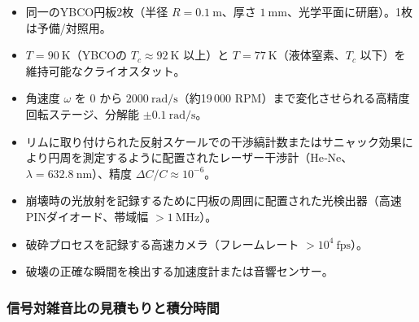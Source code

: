 \documentclass[12pt,a4paper]{article}
\begin{document}
	\begin{itemize}
		\item 同一のYBCO円板2枚（半径 \(R = 0.1\ \text{m}\)、厚さ \(1\ \text{mm}\)、光学平面に研磨）。1枚は予備/対照用。
		\item \(T = 90\ \text{K}\)（YBCOの \(T_c \approx 92\ \text{K}\) 以上）と \(T = 77\ \text{K}\)（液体窒素、\(T_c\) 以下）を維持可能なクライオスタット。
		\item 角速度 \(\omega\) を \(0\) から \(2000\ \text{rad/s}\)（約19 000 RPM）まで変化させられる高精度回転ステージ、分解能 \(\pm 0.1\ \text{rad/s}\)。
		\item リムに取り付けられた反射スケールでの干渉縞計数またはサニャック効果により円周を測定するように配置されたレーザー干渉計（He‑Ne、\(\lambda = 632.8\ \text{nm}\)）、精度 \(\Delta C/C \approx 10^{-6}\)。
		\item 崩壊時の光放射を記録するために円板の周囲に配置された光検出器（高速PINダイオード、帯域幅 \(> 1\ \text{MHz}\)）。
		\item 破砕プロセスを記録する高速カメラ（フレームレート \(> 10^4\ \text{fps}\)）。
		\item 破壊の正確な瞬間を検出する加速度計または音響センサー。
	\end{itemize}
	
	\subsubsection{信号対雑音比の見積もりと積分時間}
	
\end{document}
